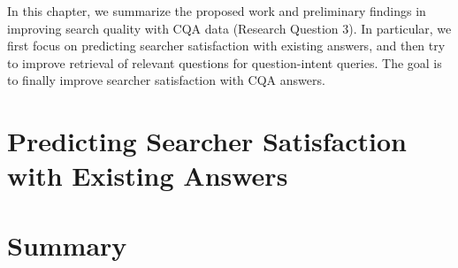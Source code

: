 %



\noindent
In this chapter, we summarize the proposed work and preliminary findings in improving search quality with CQA data (Research Question 3). In particular, we first focus on predicting searcher satisfaction with existing answers, and then try to improve retrieval of relevant questions for question-intent queries. The goal is to finally improve searcher satisfaction with CQA answers.



\section{Predicting Searcher Satisfaction with Existing Answers}
\label{sec:searcher-satisfaction}



\section{Summary}

